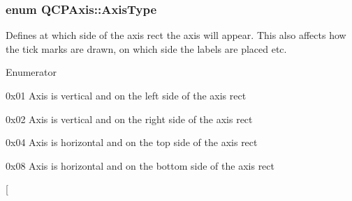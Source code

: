 \subsubsection[{\texorpdfstring{Axis\+Type}{AxisType}}]{\setlength{\rightskip}{0pt plus 5cm}enum {\bf Q\+C\+P\+Axis\+::\+Axis\+Type}}\hypertarget{class_q_c_p_axis_ae2bcc1728b382f10f064612b368bc18a}{}\label{class_q_c_p_axis_ae2bcc1728b382f10f064612b368bc18a}
Defines at which side of the axis rect the axis will appear. This also affects how the tick marks are drawn, on which side the labels are placed etc. \begin{Desc}
\item[Enumerator]\par
\begin{description}
\item[{\em 
at\+Left\hypertarget{class_q_c_p_axis_ae2bcc1728b382f10f064612b368bc18aa8b78b9b79503778969f793bf03ab2fc6}{}\label{class_q_c_p_axis_ae2bcc1728b382f10f064612b368bc18aa8b78b9b79503778969f793bf03ab2fc6}
}]{\ttfamily 0x01} Axis is vertical and on the left side of the axis rect \item[{\em 
at\+Right\hypertarget{class_q_c_p_axis_ae2bcc1728b382f10f064612b368bc18aa2f0eb342b63c46c1388fc50fd7e9bcc5}{}\label{class_q_c_p_axis_ae2bcc1728b382f10f064612b368bc18aa2f0eb342b63c46c1388fc50fd7e9bcc5}
}]{\ttfamily 0x02} Axis is vertical and on the right side of the axis rect \item[{\em 
at\+Top\hypertarget{class_q_c_p_axis_ae2bcc1728b382f10f064612b368bc18aaf239a04211a4faa9cc6b637f3e1febd3}{}\label{class_q_c_p_axis_ae2bcc1728b382f10f064612b368bc18aaf239a04211a4faa9cc6b637f3e1febd3}
}]{\ttfamily 0x04} Axis is horizontal and on the top side of the axis rect \item[{\em 
at\+Bottom\hypertarget{class_q_c_p_axis_ae2bcc1728b382f10f064612b368bc18aa008abfe8978d3e7074635766e4b7b451}{}\label{class_q_c_p_axis_ae2bcc1728b382f10f064612b368bc18aa008abfe8978d3e7074635766e4b7b451}
}]{\ttfamily 0x08} Axis is horizontal and on the bottom side of the axis rect \item[{\em 
}
\end{description}
\end{Desc}
